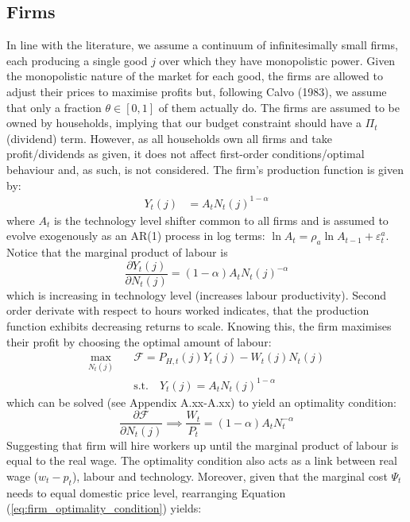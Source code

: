 \subsection{Firms}
In line with the literature, we assume a continuum of infinitesimally small firms, each producing a single good $j$ over which they have monopolistic power. Given the monopolistic nature of the market for each good, the firms are allowed to adjust their prices to maximise profits but, following Calvo (1983), we assume that only a fraction $\theta \in [0,1]$ of them actually do. The firms are assumed to be owned by households, implying that our budget constraint should have a $\Pi_t$ (dividend) term. However, as all households own all firms and take profit/dividends as given, it does not affect first-order conditions/optimal behaviour and, as such, is not considered. The firm's production function is given by: 
\begin{align}
    Y_t(j)   & = A_t {N_t(j)}^{1-\alpha}                         
\end{align}
where $A_t$ is the technology level shifter common to all firms and is assumed to evolve exogenously as an AR(1) process in log terms: $\ln A_t = \rho_a \ln A_{t-1} + \varepsilon^a_t$. Notice that the marginal product of labour is
\begin{equation}
    \frac{\partial Y_t(j)}{\partial N_t(j)} = (1-\alpha)A_t {N_t(j)}^{-\alpha}
\end{equation}
which is increasing in technology level (increases labour productivity). Second order derivate with respect to hours worked indicates, that the production function exhibits decreasing returns to scale. Knowing this, the firm maximises their profit by choosing the optimal amount of labour:
\begin{align}
    \max_{N_t(j)}             \quad & \mathcal{F} = P_{H,t}(j)Y_{t}(j) - W_t(j)N_{t}(j) \\
     & \text{s.t.} \quad  Y_t(j)    = A_t {N_t(j)}^{1-\alpha}     
\end{align}
which can be solved (see Appendix A.xx-A.xx) to yield an optimality condition:
\begin{equation}
    \frac{\partial \mathcal{F}}{\partial N_t(j)} \implies \frac{W_t}{P_t} = (1-\alpha)A_t N_t^{-\alpha} \label{eq:firm_optimality_condition}
\end{equation}
Suggesting that firm will hire workers up until the marginal product of labour is equal to the real wage. The optimality condition also acts as a link between real wage ($w_t - p_t$), labour and technology. Moreover, given that the marginal cost $\Psi_t$ needs to equal domestic price level, rearranging Equation (\ref{eq:firm_optimality_condition}) yields: 

